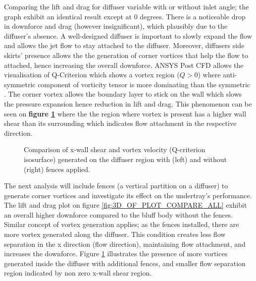 \noindent Comparing the lift and drag for diffuser variable with or without inlet angle; the graph exhibit an identical result except at 0 degrees.  There is a noticeable drop in downforce and drag (however insignificant), which plausibly due to the diffuser's absence. A well-designed diffuser is important to slowly expand the flow and allows the jet flow to stay attached to the diffuser. Moreover, diffusers side skirts' presence allows the the generation of corner vortices that help the flow to attached, hence increasing the overall downforce.  ANSYS Post CFD allows the visualisation of Q-Criterion which shows a vortex region ($Q > 0$) where anti-symmetric component of vorticity tensor is more dominating than the symmetric \cite{Holmen2012MethodsIdentification}. The corner vortex allows the boundary layer to stick on the wall which slows the pressure expansion hence reduction in lift and drag. This phenomenon can be seen on \textbf{figure \ref{fig:3D_OF_COMPARE_FENCES_SHEAR}} where the the region where vortex is present has a higher wall shear than its surrounding which indicates flow attachment in the respective direction.

\begin{figure}[!htb]
    \centering
    \noindent{}
    \caption{Comparison of x-wall shear and vortex velocity (Q-criterion isosurface) generated on the diffuser region with (left) and without (right) fences applied.}
      \label{fig:3D_OF_COMPARE_FENCES_SHEAR}
\end{figure}

\noindent The next analysis will include fences (a vertical partition on a diffuser) to generate corner vortices and investigate its effect on the undertray's performance. The lift and drag plot on figure \ref{fig:3D_OF_PLOT_COMPARE_ALL} exhibit an overall higher downforce compared to the bluff body without the fences. Similar concept of vortex generation applies; as the fences installed, there are more vortex generated along the diffuser. This condition creates less flow separation in the x direction (flow direction), maintaining flow attachment, and increases the downforce. Figure \ref{fig:3D_OF_COMPARE_FENCES_SHEAR} illustrates the presence of more vortices generated inside the diffuser with additional fences, and smaller flow separation region indicated by non zero x-wall shear region. 

